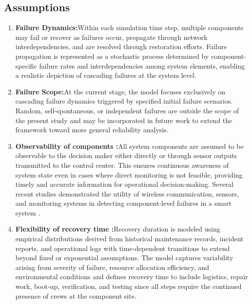\documentclass[conference]{IEEEtran}
\begin{document}
\subsection{Assumptions}
\begin{enumerate}
    
    \item \textbf{Failure Dynamics:}Within each simulation time step, multiple components may fail or recover as failures occur, propagate through network interdependencies, and are resolved through restoration efforts. Failure propagation is represented as a stochastic process determined by component-specific failure rates and interdependencies among system elements,  enabling a realistic depiction of cascading failures at the system level. \label{assumption failure}

    \item \textbf{Failure Scope:}At the current stage, the model focuses exclusively on cascading failure dynamics triggered by specified initial failure scenarios. Random, self‑spontaneous, or independent failures are outside the scope of the present study and may be incorporated in future work to extend the framework toward more general reliability analysis.\label{assumption scope}
    
    \item \textbf{Observability of components :}All system components are assumed to be observable to the decision maker either directly or through sensor outputs transmitted to the control center. This ensures continuous awareness of system state even in cases where direct monitoring is not feasible, providing timely and accurate information for operational decision‑making. Several recent studies demonstrated the utility of wireless communication, sensors, and monitoring systems in detecting component-level failures in a smart system \cite{aust_performance_2012, verma_wireless_2014, tashtarian_distributed_2018}. \label{assumption:obser}

    \item \textbf{Flexibility of recovery time :}Recovery duration is modeled using empirical distributions derived from historical maintenance records, incident reports, and operational logs with time-dependent transitions to extend beyond fixed or exponential assumptions. The model captures variability arising from severity of failure, resource allocation efficiency, and environmental conditions and defines recovery time to include logistics, repair work, boot‑up, verification, and testing since all steps require the continued presence of crews at the component site.
     \label{assumption:repairt}
    

\end{enumerate}
\end{document}
